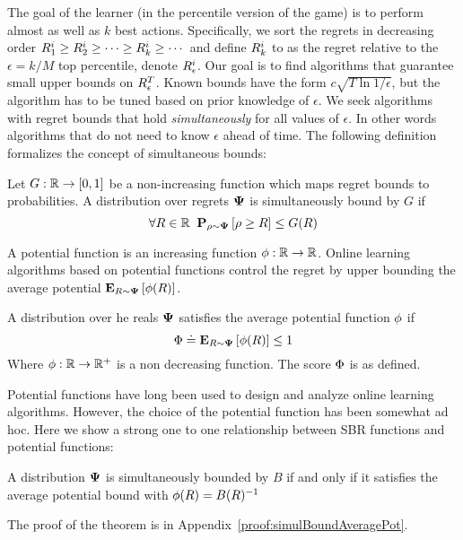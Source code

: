 \documentclass{article}[12pt]
\begin{document}
The goal of the learner (in the percentile version of the game) is to
perform almost as well as $k$ best actions. Specifically, we sort the
regrets in decreasing order
$R_1^i \geq R_2^i \geq \cdots \geq R_k^i \geq \cdots$ and define
$R_k^i$ to as the regret relative to the $\epsilon=k/M$ top
percentile, denote $R_\epsilon^i$. Our goal is to find algorithms
that guarantee small upper bounds on $R_\epsilon^T$. Known bounds
have the form $c \sqrt{T \ln {1/\epsilon}}$, but the algorithm has to
be tuned based on prior knowledge of $\epsilon$. We seek algorithms
with regret bounds that hold {\em simultaneously} for all values of
$\epsilon$. In other words algorithms that do not need to know
$\epsilon$ ahead of time. The following definition formalizes
the concept of simultaneous bounds:
\begin{definition} \label{def:unif-regret-bound} Let $G: \mathbb{R} \to [0,1]$ be a
  non-increasing function which maps regret bounds to probabilities.
  A distribution over regrets ${\bf \Psi}$ is simultaneously bound by $G$ if
  \[
    \forall R \in \mathbb{R} \;\; {\bf P}_{\rho \sim {\bf \Psi}}\left[ \rho \geq R \right] \leq G(R)
  \]
\end{definition}


A potential function is an increasing function
$\phi:\mathbb{R} \to \mathbb{R}$. Online learning algorithms based on
potential functions control the regret by upper bounding the average
potential ${\bf E}_{R \sim {\bf \Psi}}\left[ \phi(R) \right]$. 

\begin{definition} \label{def:aver-potential-bound}
  A distribution over he reals ${\bf \Psi}$ satisfies the average
  potential function $\phi$ if
  $$\Phi \doteq {\bf E}_{R \sim {\bf \Psi}}\left[ \phi(R) \right] \leq 1$$
  Where $\phi: \mathbb{R} \to \mathbb{R}^+$ is a non decreasing function. The score $\Phi$ is as defined.
\end{definition}

Potential functions have long been used to design and analyze online
learning algorithms. However, the choice of the potential function has
been somewhat ad hoc.  Here we show a strong one to one relationship
between SBR functions and potential functions:
\begin{theorem}\label{thm:simulBoundAveragePot}
 A distribution ${\bf \Psi}$ is simultaneously bounded by $B$ if and only
 if it satisfies the average potential bound with $\phi(R) = B(R)^{-1}$
\end{theorem}
The proof of the theorem is in Appendix~\ref{proof:simulBoundAveragePot}.
\end{document}
